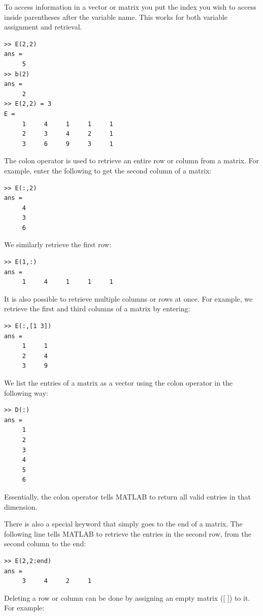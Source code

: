 To access information in a vector or matrix you put the index you wish to access inside parentheses after the variable name. This works for both variable assignment and retrieval.

\begin{lstlisting}[style=matlab]
>> E(2,2)
ans =
     5
>> b(2)
ans =
     2
>> E(2,2) = 3
E =
     1     4     1     1     1
     2     3     4     2     1
     3     6     9     3     1  
\end{lstlisting}

The colon operator is used to retrieve an entire row or column from a matrix.  For example, enter the following to get the second column of a matrix:

\begin{lstlisting}[style=matlab]
>> E(:,2)
ans =
     4
     3
     6
\end{lstlisting}

We similarly retrieve the first row:

\begin{lstlisting}[style=matlab]
>> E(1,:)
ans =
     1     4     1     1     1
\end{lstlisting}

It is also possible to retrieve multiple columns or rows at once. For example, we retrieve the first and third columns of a matrix by entering:
\begin{lstlisting}[style=matlab]
>> E(:,[1 3])
ans =
     1     1
     2     4
     3     9
\end{lstlisting}

We list the entries of a matrix as a vector using the colon operator in the following way:

\begin{lstlisting}[style=matlab]
>> D(:)
ans =
     1
     2
     3
     4
     5
     6
\end{lstlisting}

Essentially, the colon operator tells MATLAB to return all valid entries in that dimension.

There is also a special keyword  that simply goes to the end of a matrix. The following line tells MATLAB to retrieve the entries in the second row, from the second column to the end:

\begin{lstlisting}[style=matlab]
>> E(2,2:end)
ans =
     3     4     2     1
\end{lstlisting}

Deleting a row or column can be done by assigning an empty matrix ([ ]) to it. For example:

